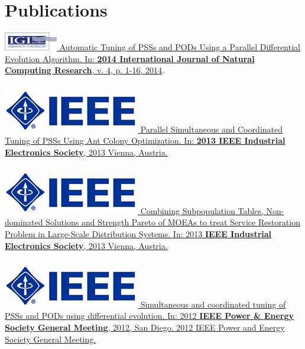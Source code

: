 \documentclass[]{friggeri-cv}
\begin{document}
\section{Publications}

\href{http://dx.doi.org/10.4018/ijncr.2014010101}{\includegraphics[height=\fontcharht\font`\B]{img/igi_global_.png} Automatic Tuning of PSSs and PODs Using a Parallel Differential Evolution Algorithm. In: \textbf{2014 International Journal of Natural Computing Research}, v. 4, p. 1-16, 2014}.\\
\\
\href{http://dx.doi.org/10.1109/IECON.2013.6699462}{\includegraphics[scale=0.11]{img/ieee.jpg} Parallel Simultaneous and Coordinated Tuning of PSSs Using Ant Colony Optimization. In: \textbf{2013 IEEE Industrial Electronics Society}, 2013 Vienna, Austria.}\\
\\
\href{http://dx.doi.org/10.1109/IECON.2013.6699436}{\includegraphics[scale=0.11]{img/ieee.jpg} Combining Subpopulation Tables, Non-dominated Solutions and Strength Pareto of MOEAs to treat Service Restoration Problem in Large-Scale Distribution Systems. In: 2013 \textbf{IEEE Industrial Electronics Society}, 2013 Vienna, Austria.}\\
\\
\href{http://dx.doi.org/10.1109/PESGM.2012.6345340}{\includegraphics[scale=0.11]{img/ieee.jpg} Simultaneous and coordinated tuning of PSSs and PODs using differential evolution. In: 2012 \textbf{IEEE Power \& Energy Society General Meeting}, 2012, San Diego. 2012 IEEE Power and Energy Society General Meeting.}%
\end{document}
